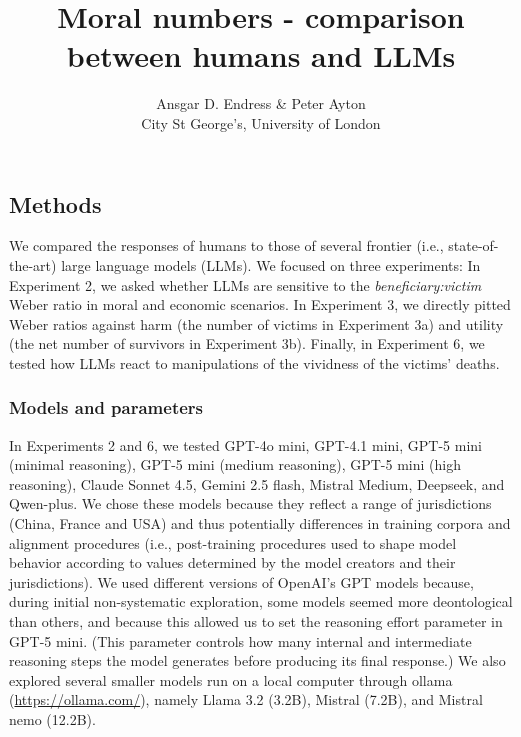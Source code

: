 \documentclass[
]{article}
\title{Moral numbers - comparison between humans and LLMs}
\author{Ansgar D. Endress \& Peter Ayton\\
City St George's, University of London}
\date{}
\begin{document}
\maketitle

\subsection{Methods}\label{methods}

We compared the responses of humans to those of several frontier (i.e., state-of-the-art) large language models (LLMs). We focused on three experiments: In Experiment 2, we asked whether LLMs are sensitive to the \emph{beneficiary:victim} Weber ratio in moral and economic scenarios. In Experiment 3, we directly pitted Weber ratios against harm (the number of victims in Experiment 3a) and utility (the net number of survivors in Experiment 3b). Finally, in Experiment 6, we tested how LLMs react to manipulations of the vividness of the victims' deaths.

\subsubsection{Models and parameters}\label{models-and-parameters}

In Experiments 2 and 6, we tested GPT-4o mini, GPT-4.1 mini, GPT-5 mini (minimal reasoning), GPT-5 mini (medium reasoning), GPT-5 mini (high reasoning), Claude Sonnet 4.5, Gemini 2.5 flash, Mistral Medium, Deepseek, and Qwen-plus. We chose these models because they reflect a range of jurisdictions (China, France and USA) and thus potentially differences in training corpora and alignment procedures (i.e., post-training procedures used to shape model behavior according to values determined by the model creators and their jurisdictions). We used different versions of OpenAI's GPT models because, during initial non-systematic exploration, some models seemed more deontological than others, and because this allowed us to set the reasoning effort parameter in GPT-5 mini. (This parameter controls how many internal and intermediate reasoning steps the model generates before producing its final response.) We also explored several smaller models run on a local computer through ollama (\url{https://ollama.com/}), namely Llama 3.2 (3.2B), Mistral (7.2B), and Mistral nemo (12.2B).
\end{document}
